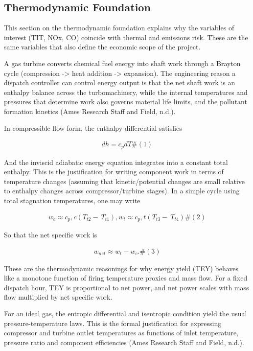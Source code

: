 \documentclass[11pt]{article}
\begin{document}
\subsection{Thermodynamic Foundation}\label{thermodynamic-foundation}

This section on the thermodynamic foundation explains why the variables
of interest (TIT, NOx, CO) coincide with thermal and emissions risk.
These are the same variables that also define the economic scope of the
project.

A gas turbine converts chemical fuel energy into shaft work through a
Brayton cycle (compression -\textgreater{} heat addition -\textgreater{}
expansion). The engineering reason a dispatch controller can control
energy output is that the net shaft work is an enthalpy balance across
the turbomachinery, while the internal temperatures and pressures that
determine work also governs material life limits, and the pollutant
formation kinetics (Ames Research Staff and Field, n.d.).

In compressible flow form, the enthalpy differential satisfies

\[\begin{array}{r}
dh = c_{p}dT\#(1)
\end{array}\]

And the inviscid adiabatic energy equation integrates into a constant
total enthalpy. This is the justification for writing component work in
terms of temperature changes (assuming that kinetic/potential changes
are small relative to enthalpy changes across compressor/turbine
stages). In a simple cycle using total stagnation temperatures, one may
write

\[\begin{array}{r}
w_{c} \approx c_{p},c\left( T_{t2} - \ T_{t1} \right),w_{t} \approx c_{p},t\left( T_{t3} - \ T_{t4} \right)\#(2)
\end{array}\]

So that the net specific work is

\[\begin{array}{r}
w_{net} \approx w_{t} - w_{c}.\#(3)
\end{array}\]

These are the thermodynamic reasonings for why energy yield (TEY)
behaves like a monotone function of firing temperature proxies and mass
flow. For a fixed dispatch hour, TEY is proportional to net power, and
net power scales with mass flow multiplied by net specific work.

For an ideal gas, the entropic differential and isentropic condition
yield the usual pressure-temperature laws. This is the formal
justification for expressing compressor and turbine outlet temperatures
as functions of inlet temperature, pressure ratio and component
efficiencies (Ames Research Staff and Field, n.d.).
\end{document}
